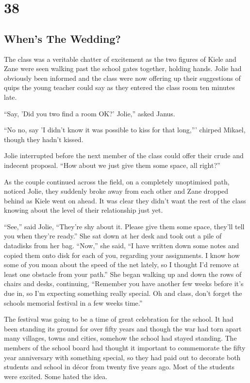 \chapter{38}
\section{When's The Wedding?}


The class was a veritable chatter of excitement as the two figures of Kiele and Zane were seen walking past the school gates together, holding hands.  Jolie had obviously been informed and the class were now offering up their suggestions of quips the young teacher could say as they entered the class room ten minutes late.

``Say, 'Did you two find a room OK?' Jolie,'' asked Janus.  

``No no, say 'I didn't know it was possible to kiss for that long,''' chirped Mikael, though they hadn't kissed.

Jolie interrupted before the next member of the class could offer their crude and indecent proposal.  ``How about we just give them some space, all right?''

As the couple continued across the field, on a completely unoptimised path, noticed Jolie, they suddenly broke away from each other and Zane dropped behind as Kiele went on ahead.  It was clear they didn't want the rest of the class knowing about the level of their relationship just yet.

``See,'' said Jolie, ``They're shy about it.  Please give them some space, they'll tell you when they're ready.''  She sat down at her desk and took out a pile of datadisks from her bag.  ``Now,'' she said, ``I have written down some notes and copied them onto disk for each of you, regarding your assignments.  I know how some of you moan about the speed of the net lately, so I thought I'd remove at least one obstacle from your path.''  She began walking up and down the rows of chairs and desks, continuing, ``Remember you have another few weeks before it's due in, so I'm expecting something really special.  Oh and class, don't forget the schools memorial festival in a few weeks time.''

The festival was going to be a time of great celebration for the school.  It had been standing its ground for over fifty years and though the war had torn apart many villages, towns and cities, somehow the school had stayed standing.  The members of the school board had thought it important to commemorate the fifty year anniversary with something special, so they had paid out to decorate both students and school in décor from twenty five years ago.  Most of the students were excited.  Some hated the idea.

